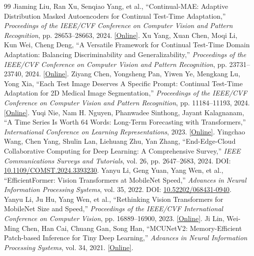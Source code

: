 \begin{thebibliography}{99}
 Jiaming Liu, Ran Xu, Senqiao Yang, et al., ``Continual-MAE: Adaptive Distribution Masked Autoencoders for Continual Test-Time Adaptation,'' \emph{Proceedings of the IEEE/CVF Conference on Computer Vision and Pattern Recognition}, pp. 28653--28663, 2024. \href{https://openaccess.thecvf.com/content/CVPR2024/html/Liu_Continual-MAE_Adaptive_Distribution_Masked_Autoencoders_for_Continual_Test-Time_Adaptation_CVPR_2024_paper.html}{[Online]}.
 Xu Yang, Xuan Chen, Moqi Li, Kun Wei, Cheng Deng, ``A Versatile Framework for Continual Test-Time Domain Adaptation: Balancing Discriminability and Generalizability,'' \emph{Proceedings of the IEEE/CVF Conference on Computer Vision and Pattern Recognition}, pp. 23731--23740, 2024. \href{https://openaccess.thecvf.com/content/CVPR2024/html/Yang_A_Versatile_Framework_for_Continual_Test-Time_Domain_Adaptation_Balancing_Discriminability_CVPR_2024_paper.html}{[Online]}.
 Ziyang Chen, Yongsheng Pan, Yiwen Ye, Mengkang Lu, Yong Xia, ``Each Test Image Deserves A Specific Prompt: Continual Test-Time Adaptation for 2D Medical Image Segmentation,'' \emph{Proceedings of the IEEE/CVF Conference on Computer Vision and Pattern Recognition}, pp. 11184--11193, 2024. \href{https://openaccess.thecvf.com/content/CVPR2024/html/Chen_Each_Test_Image_Deserves_A_Specific_Prompt_Continual_Test-Time_Adaptation_CVPR_2024_paper.html}{[Online]}.
 Yuqi Nie, Nam H. Nguyen, Phanwadee Sinthong, Jayant Kalagnanam, ``A Time Series Is Worth 64 Words: Long-Term Forecasting with Transformers,'' \emph{International Conference on Learning Representations}, 2023. \href{https://mlanthology.org/iclr/2023/nie2023iclr-time/}{[Online]}.
 Yingchao Wang, Chen Yang, Shulin Lan, Liehuang Zhu, Yan Zhang, ``End-Edge-Cloud Collaborative Computing for Deep Learning: A Comprehensive Survey,'' \emph{IEEE Communications Surveys and Tutorials}, vol. 26, pp. 2647--2683, 2024. DOI: \href{https://doi.org/10.1109/COMST.2024.3393230}{10.1109/COMST.2024.3393230}.
 Yanyu Li, Geng Yuan, Yang Wen, et al., ``EfficientFormer: Vision Transformers at MobileNet Speed,'' \emph{Advances in Neural Information Processing Systems}, vol. 35, 2022. DOI: \href{https://doi.org/10.52202/068431-0940}{10.52202/068431-0940}.
 Yanyu Li, Ju Hu, Yang Wen, et al., ``Rethinking Vision Transformers for MobileNet Size and Speed,'' \emph{Proceedings of the IEEE/CVF International Conference on Computer Vision}, pp. 16889--16900, 2023. \href{https://openaccess.thecvf.com/content/ICCV2023/html/Li_Rethinking_Vision_Transformers_for_MobileNet_Size_and_Speed_ICCV_2023_paper.html}{[Online]}.
 Ji Lin, Wei-Ming Chen, Han Cai, Chuang Gan, Song Han, ``MCUNetV2: Memory-Efficient Patch-based Inference for Tiny Deep Learning,'' \emph{Advances in Neural Information Processing Systems}, vol. 34, 2021. \href{https://proceedings.neurips.cc/paper_files/paper/2021/file/1371bccec2447b5aa6d96d2a540fb401-Paper.pdf}{[Online]}.
\end{thebibliography}
